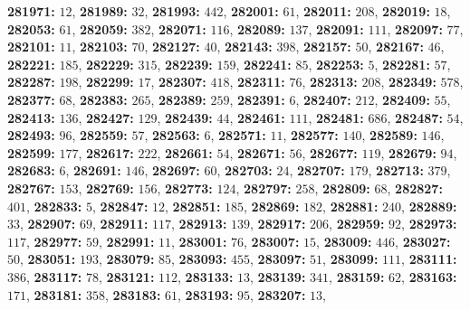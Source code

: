 \textsf{\bfseries 281971:} $12$, \textsf{\bfseries 281989:} $32$, \textsf{\bfseries 281993:} $442$, \textsf{\bfseries 282001:} $61$, \textsf{\bfseries 282011:} $208$, \textsf{\bfseries 282019:} $18$, \textsf{\bfseries 282053:} $61$, \textsf{\bfseries 282059:} $382$, \textsf{\bfseries 282071:} $116$, \textsf{\bfseries 282089:} $137$, \textsf{\bfseries 282091:} $111$, \textsf{\bfseries 282097:} $77$, \textsf{\bfseries 282101:} $11$, \textsf{\bfseries 282103:} $70$, \textsf{\bfseries 282127:} $40$, \textsf{\bfseries 282143:} $398$, \textsf{\bfseries 282157:} $50$, \textsf{\bfseries 282167:} $46$, \textsf{\bfseries 282221:} $185$, \textsf{\bfseries 282229:} $315$, \textsf{\bfseries 282239:} $159$, \textsf{\bfseries 282241:} $85$, \textsf{\bfseries 282253:} $5$, \textsf{\bfseries 282281:} $57$, \textsf{\bfseries 282287:} $198$, \textsf{\bfseries 282299:} $17$, \textsf{\bfseries 282307:} $418$, \textsf{\bfseries 282311:} $76$, \textsf{\bfseries 282313:} $208$, \textsf{\bfseries 282349:} $578$, \textsf{\bfseries 282377:} $68$, \textsf{\bfseries 282383:} $265$, \textsf{\bfseries 282389:} $259$, \textsf{\bfseries 282391:} $6$, \textsf{\bfseries 282407:} $212$, \textsf{\bfseries 282409:} $55$, \textsf{\bfseries 282413:} $136$, \textsf{\bfseries 282427:} $129$, \textsf{\bfseries 282439:} $44$, \textsf{\bfseries 282461:} $111$, \textsf{\bfseries 282481:} $686$, \textsf{\bfseries 282487:} $54$, \textsf{\bfseries 282493:} $96$, \textsf{\bfseries 282559:} $57$, \textsf{\bfseries 282563:} $6$, \textsf{\bfseries 282571:} $11$, \textsf{\bfseries 282577:} $140$, \textsf{\bfseries 282589:} $146$, \textsf{\bfseries 282599:} $177$, \textsf{\bfseries 282617:} $222$, \textsf{\bfseries 282661:} $54$, \textsf{\bfseries 282671:} $56$, \textsf{\bfseries 282677:} $119$, \textsf{\bfseries 282679:} $94$, \textsf{\bfseries 282683:} $6$, \textsf{\bfseries 282691:} $146$, \textsf{\bfseries 282697:} $60$, \textsf{\bfseries 282703:} $24$, \textsf{\bfseries 282707:} $179$, \textsf{\bfseries 282713:} $379$, \textsf{\bfseries 282767:} $153$, \textsf{\bfseries 282769:} $156$, \textsf{\bfseries 282773:} $124$, \textsf{\bfseries 282797:} $258$, \textsf{\bfseries 282809:} $68$, \textsf{\bfseries 282827:} $401$, \textsf{\bfseries 282833:} $5$, \textsf{\bfseries 282847:} $12$, \textsf{\bfseries 282851:} $185$, \textsf{\bfseries 282869:} $182$, \textsf{\bfseries 282881:} $240$, \textsf{\bfseries 282889:} $33$, \textsf{\bfseries 282907:} $69$, \textsf{\bfseries 282911:} $117$, \textsf{\bfseries 282913:} $139$, \textsf{\bfseries 282917:} $206$, \textsf{\bfseries 282959:} $92$, \textsf{\bfseries 282973:} $117$, \textsf{\bfseries 282977:} $59$, \textsf{\bfseries 282991:} $11$, \textsf{\bfseries 283001:} $76$, \textsf{\bfseries 283007:} $15$, \textsf{\bfseries 283009:} $446$, \textsf{\bfseries 283027:} $50$, \textsf{\bfseries 283051:} $193$, \textsf{\bfseries 283079:} $85$, \textsf{\bfseries 283093:} $455$, \textsf{\bfseries 283097:} $51$, \textsf{\bfseries 283099:} $111$, \textsf{\bfseries 283111:} $386$, \textsf{\bfseries 283117:} $78$, \textsf{\bfseries 283121:} $112$, \textsf{\bfseries 283133:} $13$, \textsf{\bfseries 283139:} $341$, \textsf{\bfseries 283159:} $62$, \textsf{\bfseries 283163:} $171$, \textsf{\bfseries 283181:} $358$, \textsf{\bfseries 283183:} $61$, \textsf{\bfseries 283193:} $95$, \textsf{\bfseries 283207:} $13$, 
